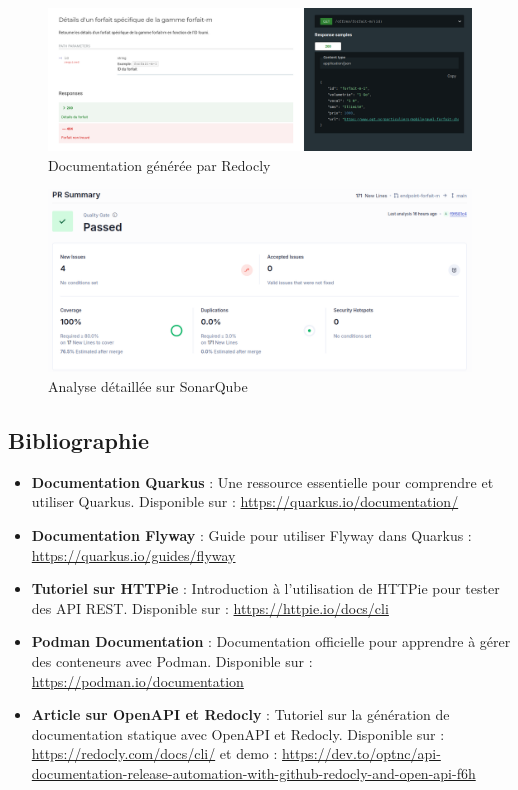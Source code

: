\documentclass{article}
\begin{document}
	\begin{figure}[H]
		\centering
		\includegraphics[width=\textwidth]{asset/Redocly_v2.png}
		\caption{Documentation générée par Redocly}
		\label{fig:redocly}
	\end{figure}
	\begin{figure}[H] \centering \includegraphics[width=\textwidth]{asset/analyse_sonarq.png} \caption{Analyse détaillée sur SonarQube} \label{fig:sonarq}\end{figure}
	\subsection{Bibliographie}
	\begin{itemize}
		\item \textbf{Documentation Quarkus} : Une ressource essentielle pour comprendre et utiliser Quarkus. Disponible sur : \url{https://quarkus.io/documentation/}
		\item \textbf{Documentation Flyway} : Guide pour utiliser Flyway dans Quarkus : \url{https://quarkus.io/guides/flyway}
		\item \textbf{Tutoriel sur HTTPie} : Introduction à l'utilisation de HTTPie pour tester des API REST. Disponible sur : \url{https://httpie.io/docs/cli}
		\item \textbf{Podman Documentation} : Documentation officielle pour apprendre à gérer des conteneurs avec Podman. Disponible sur : \url{https://podman.io/documentation}
		\item \textbf{Article sur OpenAPI et Redocly} : Tutoriel sur la génération de documentation statique avec OpenAPI et Redocly. Disponible sur : \url{https://redocly.com/docs/cli/} et demo : \url{https://dev.to/optnc/api-documentation-release-automation-with-github-redocly-and-open-api-f6h}
	\end{itemize}
	
\end{document}
